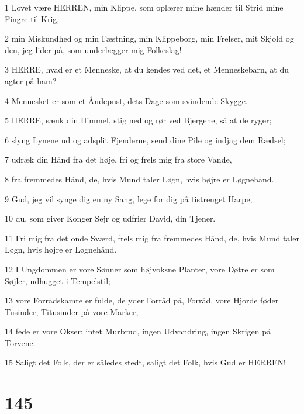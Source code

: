 \par 1 Lovet være HERREN, min Klippe, som oplærer mine hænder til Strid mine Fingre til Krig,
\par 2 min Miskundhed og min Fæstning, min Klippeborg, min Frelser, mit Skjold og den, jeg lider på, som underlægger mig Folkeslag!
\par 3 HERRE, hvad er et Menneske, at du kendes ved det, et Menneskebarn, at du agter på ham?
\par 4 Mennesket er som et Åndepust, dets Dage som svindende Skygge.
\par 5 HERRE, sænk din Himmel, stig ned og rør ved Bjergene, så at de ryger;
\par 6 slyng Lynene ud og adsplit Fjenderne, send dine Pile og indjag dem Rædsel;
\par 7 udræk din Hånd fra det høje, fri og frels mig fra store Vande,
\par 8 fra fremmedes Hånd, de, hvis Mund taler Løgn, hvis højre er Løgnehånd.
\par 9 Gud, jeg vil synge dig en ny Sang, lege for dig på tistrenget Harpe,
\par 10 du, som giver Konger Sejr og udfrier David, din Tjener.
\par 11 Fri mig fra det onde Sværd, frels mig fra fremmedes Hånd, de, hvis Mund taler Løgn, hvis højre er Løgnehånd.
\par 12 I Ungdommen er vore Sønner som højvoksne Planter, vore Døtre er som Søjler, udhugget i Tempelstil;
\par 13 vore Forrådskamre er fulde, de yder Forråd på, Forråd, vore Hjorde føder Tusinder, Titusinder på vore Marker,
\par 14 fede er vore Okser; intet Murbrud, ingen Udvandring, ingen Skrigen på Torvene.
\par 15 Saligt det Folk, der er således stedt, saligt det Folk, hvis Gud er HERREN!

\chapter{145}

